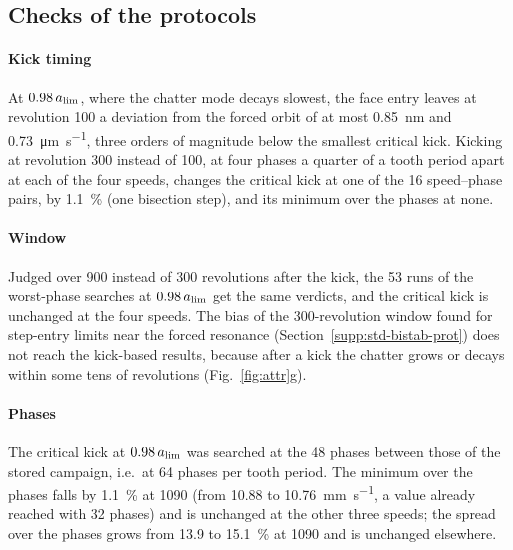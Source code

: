 \subsection{Checks of the protocols}\label{supp:bistab-checks}

\paragraph{Kick timing} At $0.98\,a_{\lim}$, where the chatter mode decays slowest, the face entry leaves at revolution 100 a deviation from the forced orbit of at most \SI{0.85}{\nano\metre} and \SI{0.73}{\micro\metre\per\second}, three orders of magnitude below the smallest critical kick. Kicking at revolution 300 instead of 100, at four phases a quarter of a tooth period apart at each of the four speeds, changes the critical kick at one of the 16 speed--phase pairs, by \SI{1.1}{\percent} (one bisection step), and its minimum over the phases at none.

\paragraph{Window} Judged over 900 instead of 300 revolutions after the kick, the 53 runs of the worst-phase searches at $0.98\,a_{\lim}$ get the same verdicts, and the critical kick is unchanged at the four speeds. The bias of the 300-revolution window found for step-entry limits near the forced resonance (Section~\ref{supp:std-bistab-prot}) does not reach the kick-based results, because after a kick the chatter grows or decays within some tens of revolutions (Fig.~\ref{fig:attr}g).

\paragraph{Phases} The critical kick at $0.98\,a_{\lim}$ was searched at the 48 phases between those of the stored campaign, i.e.\ at 64 phases per tooth period. The minimum over the phases falls by \SI{1.1}{\percent} at \SI{1090}{\rpm} (from 10.88 to \SI{10.76}{\milli\metre\per\second}, a value already reached with 32 phases) and is unchanged at the other three speeds; the spread over the phases grows from 13.9 to \SI{15.1}{\percent} at \SI{1090}{\rpm} and is unchanged elsewhere.

